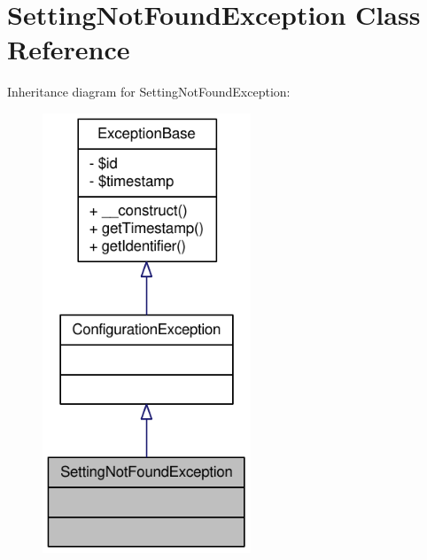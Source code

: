 \hypertarget{classSettingNotFoundException}{
\section{SettingNotFoundException Class Reference}
\label{classSettingNotFoundException}
}


Inheritance diagram for SettingNotFoundException:\nopagebreak
\begin{figure}[H]
\begin{center}
\leavevmode
\includegraphics[width=176pt]{classSettingNotFoundException__inherit__graph}
\end{center}
\end{figure}


